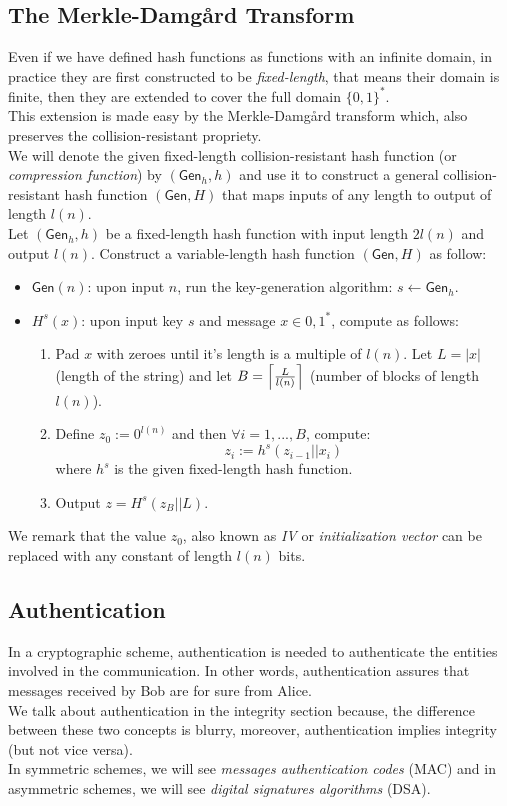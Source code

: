 \subsection{The Merkle-Damg\r{a}rd Transform}\label{sec:merkledamgard}
Even if we have defined hash functions as functions with an infinite domain, in practice they are first constructed to be \emph{fixed-length}, that means their domain is finite, then they are extended to cover the full domain $\{0,1\}^{*}$.\\
This extension is made easy by the Merkle-Damg\r{a}rd transform which, also preserves the collision-resistant propriety.\\
We will denote the given fixed-length collision-resistant hash function (or \emph{compression function}) by $(\mathsf{Gen}_h, h)$ and use it to construct a general collision-resistant hash function $(\mathsf{Gen}, H)$ that maps inputs of any length to output of length $l(n)$.\\
Let $(\mathsf{Gen}_h, h)$ be a fixed-length hash function with input length $2l(n)$ and output $l(n)$. Construct a variable-length hash function $(\mathsf{Gen}, H)$ as follow:
\begin{itemize}
    \item{$\mathsf{Gen}(n)$: upon input $n$, run the key-generation algorithm: $s \leftarrow \mathsf{Gen}_h$.}
    \item{$H^s(x)$: upon input key $s$ and message $x \in {0, 1}^{*}$, compute as follows:
        \begin{enumerate}
            \item{Pad $x$ with zeroes until it's length is a multiple of $l(n)$. Let $L = |x|$ (length of the string) and let $B = \ceil[\Big]{\frac{L}{l(n)}}$ (number of blocks of length $l(n)$).}
            \item{Define $z_0 := 0^{l(n)}$ and then $\forall i = 1,...,B$, compute:
                $$
                    z_i := h^s(z_{i-1}||x_i)
                $$
                where $h^s$ is the given fixed-length hash function.}
            \item{Output $z = H^s(z_B||L)$.}
        \end{enumerate}}
\end{itemize}
We remark that the value $z_0$, also known as \emph{IV} or \emph{initialization vector} can be replaced with any constant of length $l(n)$ bits.

\subsection{Authentication}
In a cryptographic scheme, authentication is needed to authenticate the entities involved in the communication. In other words, authentication assures that messages received by Bob are for sure from Alice.\\
We talk about authentication in the integrity section because, the difference between these two concepts is blurry, moreover, authentication implies integrity (but not vice versa).\\
In symmetric schemes, we will see \emph{messages authentication codes} (MAC) and in asymmetric schemes, we will see \emph{digital signatures algorithms} (DSA).

